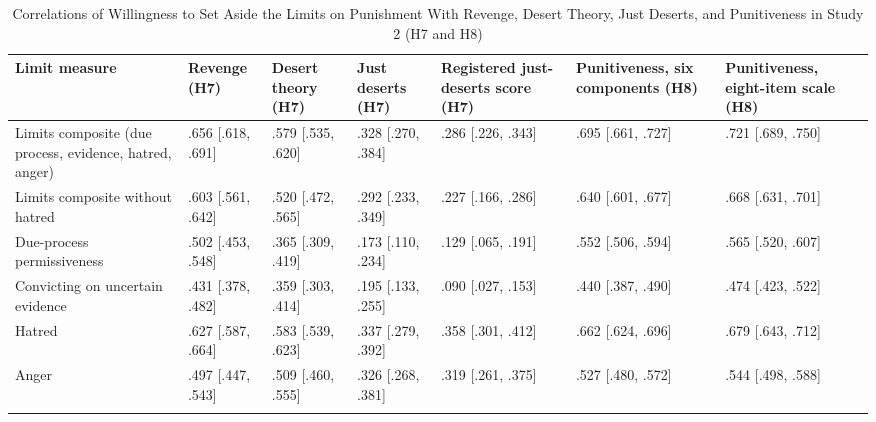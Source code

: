 \begin{table}[!htbp]
\renewcommand{\thetable}{S14}
\caption{Correlations of Willingness to Set Aside the Limits on Punishment With Revenge, Desert Theory, Just Deserts, and Punitiveness in Study 2 (H7 and H8)}
\label{tab:s14}
\footnotesize
\begin{tabular}{@{}>{\raggedright\arraybackslash}p{0.726in}>{\centering\arraybackslash}p{0.796in}>{\centering\arraybackslash}p{0.796in}>{\centering\arraybackslash}p{0.796in}>{\centering\arraybackslash}p{0.796in}>{\centering\arraybackslash}p{0.796in}>{\centering\arraybackslash}p{0.796in}@{}}
\toprule
Limit measure & Revenge (H7) & Desert theory (H7) & Just deserts (H7) & Registered just-deserts score (H7) & Punitiveness, six components (H8) & Punitiveness, eight-item scale (H8) \\
\midrule
Limits composite (due process, evidence, hatred, anger) & .656 {[}.618, .691{]} & .579 {[}.535, .620{]} & .328 {[}.270, .384{]} & .286 {[}.226, .343{]} & .695 {[}.661, .727{]} & .721 {[}.689, .750{]} \\
Limits composite without hatred & .603 {[}.561, .642{]} & .520 {[}.472, .565{]} & .292 {[}.233, .349{]} & .227 {[}.166, .286{]} & .640 {[}.601, .677{]} & .668 {[}.631, .701{]} \\
Due-process permissiveness & .502 {[}.453, .548{]} & .365 {[}.309, .419{]} & .173 {[}.110, .234{]} & .129 {[}.065, .191{]} & .552 {[}.506, .594{]} & .565 {[}.520, .607{]} \\
Convicting on uncertain evidence & .431 {[}.378, .482{]} & .359 {[}.303, .414{]} & .195 {[}.133, .255{]} & .090 {[}.027, .153{]} & .440 {[}.387, .490{]} & .474 {[}.423, .522{]} \\
Hatred & .627 {[}.587, .664{]} & .583 {[}.539, .623{]} & .337 {[}.279, .392{]} & .358 {[}.301, .412{]} & .662 {[}.624, .696{]} & .679 {[}.643, .712{]} \\*
Anger & .497 {[}.447, .543{]} & .509 {[}.460, .555{]} & .326 {[}.268, .381{]} & .319 {[}.261, .375{]} & .527 {[}.480, .572{]} & .544 {[}.498, .588{]} \\*
\bottomrule
\end{tabular}

\end{table}
